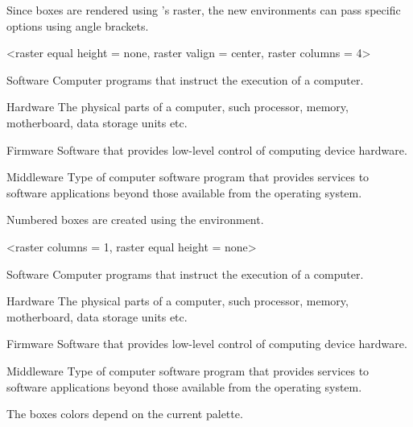\documentclass[a4paper, 11pt]{article}
\begin{document}
Since boxes are rendered using 's raster, the new environments can pass specific options using angle brackets.

\begin{example}{}
    \begin{PLTBoxItemize}
        <raster equal height = none, raster valign = center, raster columns = 4>
        \item[Software] Computer programs that instruct the execution of a computer.
        \item[Hardware] The physical parts of a computer, such processor, memory, motherboard, data storage units etc.
        \item[Firmware] Software that provides low-level control of computing device hardware.
        \item[Middleware] Type of computer software program that provides services to software applications beyond those available from the operating system.
    \end{PLTBoxItemize}
\end{example}

Numbered boxes are created using the  environment.

\begin{example}{}
    \begin{PLTBoxEnumerate}
        <raster columns = 1, raster equal height = none>
        \item[Software] Computer programs that instruct the execution of a computer.
        \item[Hardware] The physical parts of a computer, such processor, memory, motherboard, data storage units etc.
        \item[Firmware] Software that provides low-level control of computing device hardware.
        \item[Middleware] Type of computer software program that provides services to software applications beyond those available from the operating system.
    \end{PLTBoxEnumerate}
\end{example}

The boxes colors depend on the current palette.
\end{document}
